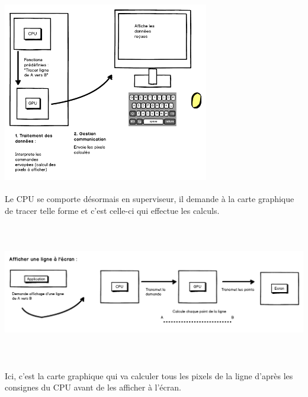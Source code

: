 \begin{center}
\includegraphics[width=9cm,height=8cm]{img/gpuRaster.png}
\end{center}
Le CPU se comporte désormais en superviseur, il demande à la carte graphique de tracer telle forme et c'est celle-ci qui effectue les calculs.

\begin{center}
\includegraphics[width=16cm,height=6cm]{img/gpuRasterExemple.png}
\end{center}
Ici, c'est la carte graphique qui va calculer tous les pixels de la ligne d'après les consignes du CPU avant de les afficher à l'écran.


\newpage

